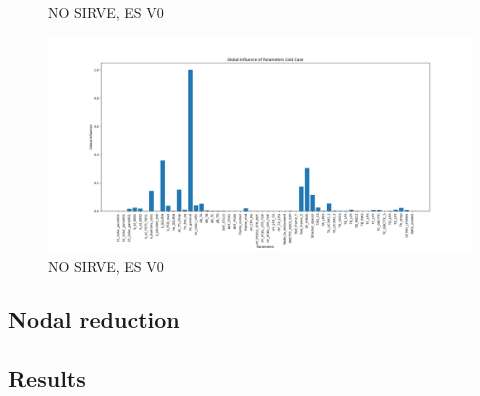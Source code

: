 \begin{itemize}
\begin{figure}[H]
	\caption{NO SIRVE, ES V0}
	\label{fig:fm3}
\end{figure}
\begin{figure}[H]
	\centering
	\includegraphics[width=\textwidth]{Figures/figs_malas/infGlobalCold.png}
	\caption{NO SIRVE, ES V0}
	\label{fig:fm4}
\end{figure}
\subsection{Nodal reduction}
\subsection{Results}










\end{itemize}
